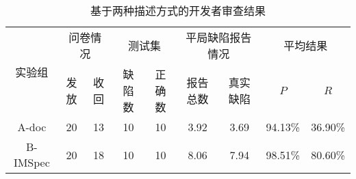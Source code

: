 \begin{table}[b]
	\centering
	\begin{minipage}[t]{\linewidth} %
		\caption{基于两种描述方式的开发者审查结果}
		\label{tab:2-5-survey}
			\begin{tabular}{ccccccccc}
			\hline
			\multirow{2}{*}{实验组} & \multicolumn{2}{c}{问卷情况} & \multicolumn{2}{c}{测试集} & \multicolumn{2}{c}{平局缺陷报告情况} & \multicolumn{2}{c}{平均结果} \\
			\cline{2-9}
			& 发放 & 收回 & 缺陷数& 正确数& 报告总数 & 真实缺陷 & $P$ & $R$ \\
			\hline
		A-doc	& 20 & 13 & 10& 10& 3.92 & 3.69 & 94.13\% & 36.90\% \\
		 B-IMSpec	& 20 & 18 & 10& 10& 8.06 & 7.94 & 98.51\% & 80.60\% \\
			\hline
		\end{tabular}
	\end{minipage}
\end{table}